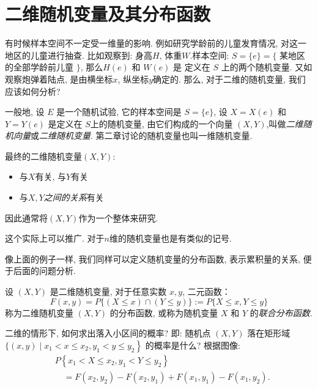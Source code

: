 \section{二维随机变量及其分布函数}

有时候样本空间不一定受一维量的影响. 例如研究学龄前的儿童发育情况, 对这一地区的儿童进行抽查.
比如观察到: 身高$H$, 体重$W$.样本空间: $S=\{e\}=\{$ 某地区的全部学龄前儿童 $\}$, 那么$H(e)$ 和 $W(e)$ 是 定义在 $S$ 上的两个随机变量.
又如观察炮弹着陆点, 是由横坐标$x$, 纵坐标$y$确定的. 那么, 对于二维的随机变量, 我们应该如何分析? 

\begin{definition}[二维随机变量]
  一般地, 设 $E$ 是一个随机试验, 它的样本空间是 $S=\{e\}$, 设 $X=X(e)$ 和 $Y=Y(e)$ 是定义在 $S$上的随机变量, 由它们构成的一个向量 $(X, Y)$,叫做\emph{二维随机向量}或\emph{二维随机变量}. 第二章讨论的随机变量也叫一维随机变量.
\end{definition}

最终的二维随机变量$(X,Y)$:
    \begin{itemize}
        \item 与$X$有关, 与$Y$有关
        \item 与$X,Y$\emph{之间的关系}有关
    \end{itemize}
  因此通常将$(X,Y)$作为一个整体来研究.

  \begin{remark}
    这个实际上可以推广. 对于$n$维的随机变量也是有类似的记号.  
  \end{remark}

  

  像上面的例子一样, 我们同样可以定义随机变量的分布函数, 表示累积量的关系, 便于后面的问题分析. 
  \begin{definition}[多维变量的分布函数]
    \label{def:cumdist}
    设 $(X, Y)$ 是二维随机变量, 对于任意实数 $x, y$, 二元函数：
    $$
        F(x, y)=P\{(X \leqslant x) \cap(Y \leqslant y)\} := P\{X \leqslant x, Y \leqslant y\}
    $$
    称为二维随机变量 $(X, Y)$ 的分布函数, 或称为随机变量 $X$ 和 $Y$ 的\emph{联合分布函数}.
\end{definition}

二维的情形下, 如何求出落入小区间的概率? 即: 随机点 $(X, Y)$ 落在矩形域 $\{(x, y)\mid \left.x_1<x \leqslant x_2, y_1<y \leqslant y_2\right\}$ 的概率是什么?
  根据图像: 
  $$
        \begin{aligned}
             & P\left\{x_1<X \leqslant x_2, y_1<Y \leqslant y_2\right\}                                            \\
             & \quad=F\left(x_2, y_2\right)-F\left(x_2, y_1\right)+F\left(x_1, y_1\right)-F\left(x_1, y_2\right) .
        \end{aligned}
    $$

